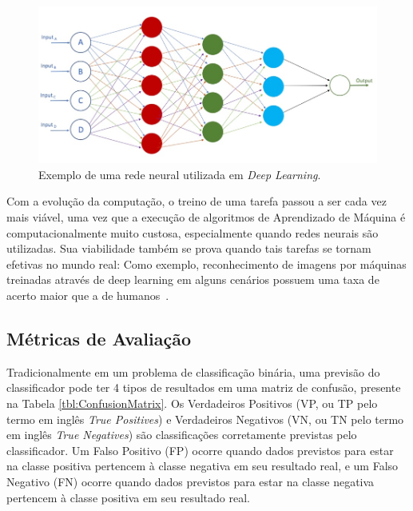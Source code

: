 \documentclass[Portugues,Final]{ic-tese-v3}
\begin{document}
\begin{figure}[h]
\centering
\includegraphics[scale=0.8]{images/deep_neural_network.jpg}
\caption {Exemplo de uma rede neural utilizada em \textit{Deep Learning}.}
\label{fig:NeuralNetwork}
\end{figure}

Com a evolução da computação, o treino de uma tarefa passou a ser cada vez mais viável, uma vez que a execução de algoritmos de Aprendizado de Máquina é computacionalmente muito custosa, especialmente quando redes neurais são utilizadas. Sua viabilidade também se prova quando tais tarefas se tornam efetivas no mundo real: Como exemplo, reconhecimento de imagens por máquinas treinadas através de deep learning em alguns cenários possuem uma taxa de acerto maior que a de humanos~\cite{Copeland_2016}.

\subsection{Métricas de Avaliação}
\label{sec:EvaluationMetrics}

Tradicionalmente em um problema de classificação binária, uma previsão do classificador pode ter 4 tipos de resultados em uma matriz de confusão, presente na Tabela \ref{tbl:ConfusionMatrix}. Os Verdadeiros Positivos (VP, ou TP pelo termo em inglês \textit{True Positives}) e Verdadeiros Negativos (VN, ou TN pelo termo em inglês \textit{True Negatives}) são classificações corretamente previstas pelo classificador. Um Falso Positivo (FP) ocorre quando dados previstos para estar na classe positiva pertencem à classe negativa em seu resultado real, e um Falso Negativo (FN) ocorre quando dados previstos para estar na classe negativa pertencem à classe positiva em seu resultado real.
\end{document}
